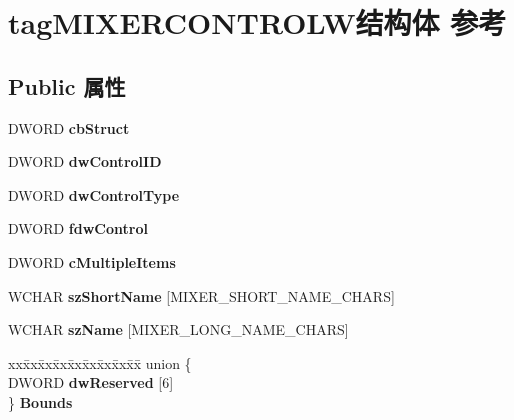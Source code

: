 \hypertarget{structtag_m_i_x_e_r_c_o_n_t_r_o_l_w}{}\section{tag\+M\+I\+X\+E\+R\+C\+O\+N\+T\+R\+O\+L\+W结构体 参考}
\label{structtag_m_i_x_e_r_c_o_n_t_r_o_l_w}
\subsection*{Public 属性}
\begin{DoxyCompactItemize}
\item 
\mbox{\label{structtag_m_i_x_e_r_c_o_n_t_r_o_l_w_a5e324aa4804a5551b53b4482b7a52a9d}} 
D\+W\+O\+RD {\bfseries cb\+Struct}
\item 
\mbox{\label{structtag_m_i_x_e_r_c_o_n_t_r_o_l_w_acca21f98e64acca6f0d465a078b63e37}} 
D\+W\+O\+RD {\bfseries dw\+Control\+ID}
\item 
\mbox{\label{structtag_m_i_x_e_r_c_o_n_t_r_o_l_w_a38793e4ce718063f0fdab36eec943471}} 
D\+W\+O\+RD {\bfseries dw\+Control\+Type}
\item 
\mbox{\label{structtag_m_i_x_e_r_c_o_n_t_r_o_l_w_a26cd65fd5cd15e119b83bc93e549fb0d}} 
D\+W\+O\+RD {\bfseries fdw\+Control}
\item 
\mbox{\label{structtag_m_i_x_e_r_c_o_n_t_r_o_l_w_a543088b2f9b0b0bc705e4712904daefe}} 
D\+W\+O\+RD {\bfseries c\+Multiple\+Items}
\item 
\mbox{\label{structtag_m_i_x_e_r_c_o_n_t_r_o_l_w_ac227cc88e088053fc4b9288ca630d8cc}} 
W\+C\+H\+AR {\bfseries sz\+Short\+Name} \mbox{[}M\+I\+X\+E\+R\+\_\+\+S\+H\+O\+R\+T\+\_\+\+N\+A\+M\+E\+\_\+\+C\+H\+A\+RS\mbox{]}
\item 
\mbox{\label{structtag_m_i_x_e_r_c_o_n_t_r_o_l_w_a0d3852a32883e2516eafabcf17d00644}} 
W\+C\+H\+AR {\bfseries sz\+Name} \mbox{[}M\+I\+X\+E\+R\+\_\+\+L\+O\+N\+G\+\_\+\+N\+A\+M\+E\+\_\+\+C\+H\+A\+RS\mbox{]}
\item 
\mbox{\label{structtag_m_i_x_e_r_c_o_n_t_r_o_l_w_a3000bf16d8538a589a9589efb8b51dcb}} 
\begin{tabbing}
xx\=xx\=xx\=xx\=xx\=xx\=xx\=xx\=xx\=\kill
union \{\\
\>DWORD {\bfseries dwReserved} \mbox{[}6\mbox{]}\\
\} {\bfseries Bounds}\\


\end{tabbing}
\end{DoxyCompactItemize}
